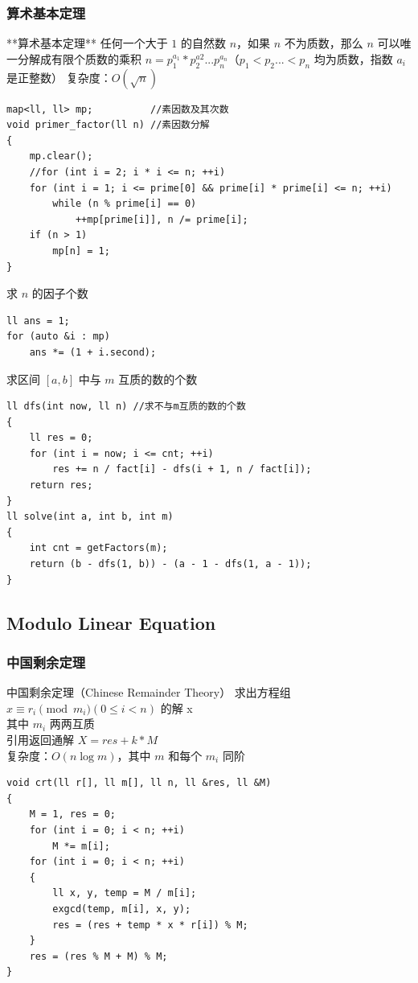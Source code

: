 \documentclass[twoside]{article}
\begin{document}
\subsubsection{算术基本定理}
**算术基本定理**
任何一个大于 $1$ 的自然数 $n$，如果 $n$ 不为质数，那么 $n$ 可以唯一分解成有限个质数的乘积
$n = p_1^{a_1} * p_2^{a2}...p_n^{a_n}$（$p_1 < p_2...< p_n$ 均为质数，指数 $a_i$ 是正整数）
复杂度：$O(\sqrt{n})$
\begin{lstlisting}
map<ll, ll> mp;          //素因数及其次数
void primer_factor(ll n) //素因数分解
{
    mp.clear();
    //for (int i = 2; i * i <= n; ++i)
    for (int i = 1; i <= prime[0] && prime[i] * prime[i] <= n; ++i)
        while (n % prime[i] == 0)
            ++mp[prime[i]], n /= prime[i];
    if (n > 1)
        mp[n] = 1;
}
\end{lstlisting}
求 $n$ 的因子个数
\begin{lstlisting}
ll ans = 1;
for (auto &i : mp)
    ans *= (1 + i.second);
\end{lstlisting}

求区间 $[a,b]$ 中与 $m$ 互质的数的个数
\begin{lstlisting}
ll dfs(int now, ll n) //求不与m互质的数的个数
{
    ll res = 0;
    for (int i = now; i <= cnt; ++i)
        res += n / fact[i] - dfs(i + 1, n / fact[i]);
    return res;
}
ll solve(int a, int b, int m)
{
    int cnt = getFactors(m);
    return (b - dfs(1, b)) - (a - 1 - dfs(1, a - 1));
}
\end{lstlisting}
\subsection{Modulo Linear Equation}
\subsubsection{中国剩余定理}
中国剩余定理（Chinese Remainder Theory）
求出方程组 $x \equiv r_i \pmod {m_i}(0 \leq i < n)$ 的解 x \\
其中 $m_i$ 两两互质 \\
引用返回通解 $X = res + k * M$ \\
复杂度：$O(n \log m)$，其中 $m$ 和每个 $m_i$ 同阶
\begin{lstlisting}
void crt(ll r[], ll m[], ll n, ll &res, ll &M)
{
    M = 1, res = 0;
    for (int i = 0; i < n; ++i)
        M *= m[i];
    for (int i = 0; i < n; ++i)
    {
        ll x, y, temp = M / m[i];
        exgcd(temp, m[i], x, y);
        res = (res + temp * x * r[i]) % M;
    }
    res = (res % M + M) % M;
}
\end{lstlisting}
\end{document}
